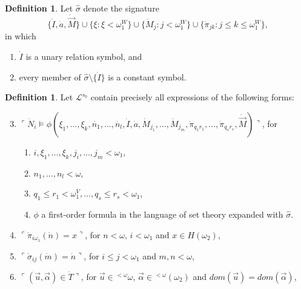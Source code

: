\documentclass[12pt, twoside]{memoir}
\numberwithin{equation}{section}
\theoremstyle{definition}
\newtheorem{defi}[thm]{Definition}
\theoremstyle{remark}
\theoremstyle{definition}
\theoremstyle{definition}
\theoremstyle{definition}
\theoremstyle{remark}
\begin{document}
\begin{defi}
Let $\hat{\sigma}$ denote the signature
\begin{equation*}
    \{\dot{I}, \dot{a}, \dot{\Vec{M}}\} \cup \{\xi : \xi < \omega_1^W\} \cup \{\dot{M}_j : j < \omega_1^W\} \cup \{\dot{\pi}_{jk} : j \leq k \leq \omega_1^W\} \text{,}
\end{equation*}
in which
\begin{enumerate}[label=(\alph*)]
    \item $\dot{I}$ is a unary relation symbol, and
    \item every member of $\hat{\sigma} \setminus \{\dot{I}\}$ is a constant symbol.
\end{enumerate}
\end{defi}

\begin{defi}\label{def433}
Let $\mathcal{L}^{s_0}$ contain precisely all expressions of the following forms:
\begin{enumerate}[label=(L\arabic*), leftmargin=40pt]
    \setcounter{enumi}{2}
    \item\label{l3} $\ulcorner \dot{N}_i \models \phi(\xi_1, \ldots, \xi_k, \dot{n_1}, \ldots, \dot{n_l}, \dot{I}, \dot{a}, \dot{M}_{j_1}, \ldots, \dot{M}_{j_m}, \dot{\pi}_{q_{1}r_{1}}, \ldots, \dot{\pi}_{q_{s}r_{s}}, \dot{\Vec{M}}) \urcorner$, for 
    \begin{enumerate}[label=(\alph*), leftmargin=15pt]
        \item $i, \xi_1, \ldots, \xi_k, j_i, \ldots, j_m < \omega_1$,
        \item $n_1, \ldots, n_l < \omega$, 
        \item $q_1 \leq r_1 < \omega_1^V, \ldots, q_s \leq r_s < \omega_1$,
        \item $\phi$ a first-order formula in the language of set theory expanded with $\hat{\sigma}$.
    \end{enumerate}
    \item\label{l4} $\ulcorner \dot{\pi}_{i\omega_1}(\dot{n}) = x \urcorner$, for $n < \omega$, $i < \omega_1$ and $x \in H(\omega_2)$,
    \item\label{l6} $\ulcorner \dot{\sigma}_{ij}(\dot{m}) = \dot{n} \urcorner$, for $i \leq j < \omega_1$ and $m, n < \omega$, 
    \item\label{l7} $\ulcorner (\Vec{u}, \Vec{\alpha}) \in \dot{T} \urcorner$, for $\Vec{u} \in {^{<\omega}{\omega}}$, $\Vec{\alpha} \in {^{<\omega}{(\omega_2)}}$ and $dom(\Vec{u}) = dom(\Vec{\alpha})$,
\end{enumerate}
\end{defi}
\end{document}
